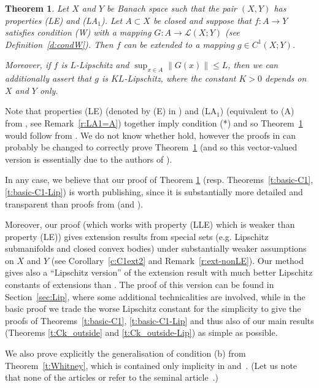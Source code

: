 \documentclass[a4paper,twoside,10pt,reqno,draft]{amsart}
\newtheorem{theorem}{Theorem}
\theoremstyle{definition}
\theoremstyle{remark}
\newcommand\norm[1]{\mathopen\|#1\mathclose\|}
\newcommand\lin[2]{\mathcal L(#1;#2)}
\newcommand\pLA[1]{(LA$_#1$)}
\newcommand\pLLE{(LLE)}
\newcommand\pLE{(LE)}
\newcommand\cW{(W)}
\begin{document}
\begin{theorem}\label{t:ext_simple}
Let $X$ and $Y$ be Banach space such that the pair $(X,Y)$ has properties {\pLE} and \pLA1.
Let $A\subset X$ be closed and suppose that $f\colon A\to Y$ satisfies condition {\cW} with a mapping $G\colon A\to\lin XY$ (see Definition~\ref{d:condW}).
Then $f$ can be extended to a mapping $g\in C^1(X;Y)$.

Moreover, if $f$ is $L$-Lipschitz and $\sup_{x\in A}\norm{G(x)}\le L$, then we can additionally assert that $g$ is $KL$-Lipschitz, where the constant $K>0$ depends on $X$ and $Y$ only.
\end{theorem}

Note that properties {\pLE} (denoted by (E) in \cite{JS2}) and \pLA1 (equivalent to (A) from \cite{JS2}, see Remark~\ref{r:LA1=A}) together imply condition (*)
and so Theorem~\ref{t:ext_simple} would follow from \cite[Theorems 3.1 and 3.2]{JS2}.
We do not know whether \cite[Theorems 3.1 and 3.2]{JS2} hold, however the proofs in \cite{JS2} can probably be changed to correctly prove Theorem~\ref{t:ext_simple}
(and so this vector-valued version is essentially due to the authors of \cite{JS2}).

In any case, we believe that our proof of Theorem \ref{t:ext_simple} (resp. Theorems~\ref{t:basic-C1}, \ref{t:basic-C1-Lip}) is worth publishing, since it is substantially more detailed and transparent than proofs from \cite{JS2} (and \cite{JS1}).

Moreover, our proof (which works with property {\pLLE} which is weaker than property {\pLE}) gives extension results from special sets (e.g. Lipschitz submanifolds and closed convex bodies)
under substantially weaker assumptions on $X$ and $Y$ (see Corollary~\ref{c:C1ext2} and Remark~\ref{r:ext-nonLE}).
Our method gives also a ``Lipschitz version'' of the extension result with much better Lipschitz constants of extensions than \cite[Theorem~A.2]{JS1}.
The proof of this version can be found in Section~\ref{sec:Lip}, where some additional technicalities are involved,
while in the basic proof we trade the worse Lipschitz constant for the simplicity to give the proofs of Theorems~\ref{t:basic-C1}, \ref{t:basic-C1-Lip}
and thus also of our main results (Theorems \ref{t:Ck_outside} and \ref{t:Ck_outside-Lip}) as simple as possible.

We also prove explicitly the generalisation of condition (b) from Theorem~\ref{t:Whitney}, which is contained only implicity in \cite{JS1} and~\cite{JS2}.
(Let us note that none of the articles \cite{JS1} or \cite{JS2} refer to the seminal article~\cite{Wh1}.)
\end{document}
